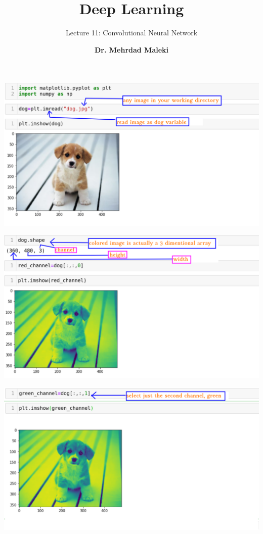 \documentclass[12pt,aspectratio=169]{beamer}
\title{Deep Learning}
\subtitle{Lecture 11: Convolutional Neural Network}
\author[]{\textbf{Dr. Mehrdad Maleki}}
\date{}
\begin{document}
 
\frame{\titlepage}


\begin{frame}
\begin{center}
\includegraphics[scale=0.5]{dog1}
\end{center}
\end{frame}

\begin{frame}
\begin{center}
\includegraphics[scale=0.5]{dog2}
\end{center}
\end{frame}

\begin{frame}
\begin{center}
\includegraphics[scale=0.5]{dog3}
\end{center}
\end{frame}
\end{document}
